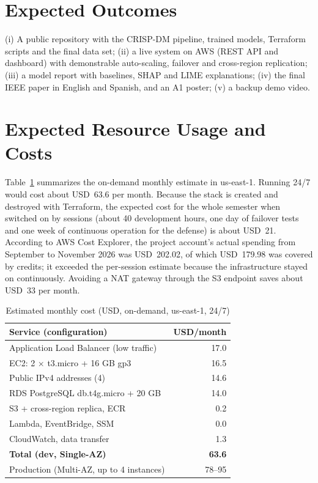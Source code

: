 \documentclass[conference]{IEEEtran}
\begin{document}
\section{Expected Outcomes}
(i) A public repository with the CRISP-DM pipeline, trained models, Terraform scripts and the final data set; (ii) a live system on AWS (REST API and dashboard) with demonstrable auto-scaling, failover and cross-region replication; (iii) a model report with baselines, SHAP and LIME explanations; (iv) the final IEEE paper in English and Spanish, and an A1 poster; (v) a backup demo video.

\section{Expected Resource Usage and Costs}
Table~\ref{tab:cost} summarizes the on-demand monthly estimate in us-east-1. Running 24/7 would cost about USD~63.6 per month. Because the stack is created and destroyed with Terraform, the expected cost for the whole semester when switched on by sessions (about 40 development hours, one day of failover tests and one week of continuous operation for the defense) is about USD~21. According to AWS Cost Explorer, the project account's actual spending from September to November 2026 was USD~202.02, of which USD~179.98 was covered by credits; it exceeded the per-session estimate because the infrastructure stayed on continuously. Avoiding a NAT gateway through the S3 endpoint saves about USD~33 per month.

\begin{table}[t]
\caption{Estimated monthly cost (USD, on-demand, us-east-1, 24/7)}
\label{tab:cost}
\centering
\begin{tabular}{@{}lr@{}}
\toprule
Service (configuration) & USD/month \\
\midrule
Application Load Balancer (low traffic) & 17.0 \\
EC2: 2 $\times$ t3.micro + 16 GB gp3 & 16.5 \\
Public IPv4 addresses (4) & 14.6 \\
RDS PostgreSQL db.t4g.micro + 20 GB & 14.0 \\
S3 + cross-region replica, ECR & 0.2 \\
Lambda, EventBridge, SSM & 0.0 \\
CloudWatch, data transfer & 1.3 \\
\midrule
\textbf{Total (dev, Single-AZ)} & \textbf{63.6} \\
Production (Multi-AZ, up to 4 instances) & 78--95 \\
\bottomrule
\end{tabular}
\end{table}
\end{document}
